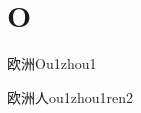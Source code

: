 ﻿%
\section*{O}

\begin{verbete}[8;9]{欧洲}{Ou1zhou1}
\end{verbete}

\begin{verbete}[8;9;2]{欧洲人}{ou1zhou1ren2}
\end{verbete}


